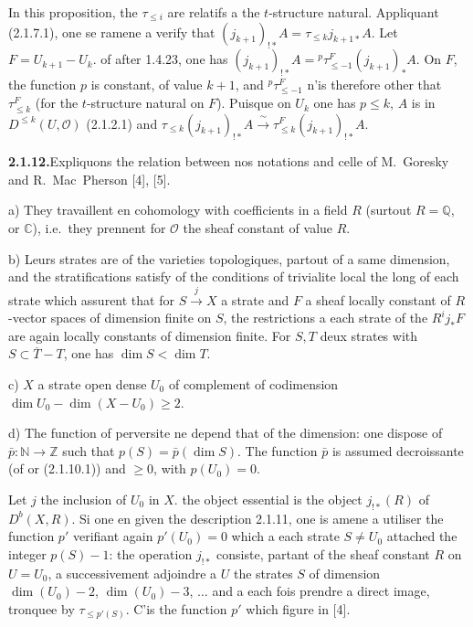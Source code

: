 \documentclass[12pt,a4paper]{article}
\theoremstyle{plain}
\theoremstyle{definition}
\begin{document}
In this proposition, the $\tau_{\leqslant i}$ are relatifs a the $t$-structure natural. Appliquant (2.1.7.1), one se ramene a verify that $(j_{k+1})_{!*} A = \tau_{\leqslant k} j_{k+1*} A$. Let $F = U_{k+1} - U_k$. of after 1.4.23, one has $(j_{k+1})_{!*} A = {}^p \tau_{\leqslant -1}^F (j_{k+1})_* A$. On $F$, the function $p$ is constant, of value $k+1$, and ${}^p \tau_{\leqslant -1}^F$ n'is therefore other that $\tau_{\leqslant k}^F$ (for the $t$-structure natural on $F$). Puisque on $U_k$ one has $p \leqslant k$, $A$ is in $D^{\leqslant k}(U, \mathcal{O})$ (2.1.2.1) and $\tau_{\leqslant k} (j_{k+1})_{!*} A \xrightarrow{\;\sim\;} \tau_{\leqslant k}^F (j_{k+1})_{!*} A$.

\smallskip
\noindent\textbf{2.1.12.}\quad Expliquons the relation between nos notations and celle of M.~Goresky and R.~Mac~Pherson [4], [5].

a) They travaillent en cohomology with coefficients in a field $R$ (surtout $R = \mathbb{Q}$, or $\mathbb{C}$), i.e.\ they prennent for $\mathcal{O}$ the sheaf constant of value $R$.

b) Leurs strates are of the varieties topologiques, partout of a same dimension, and the stratifications satisfy of the conditions of trivialite local the long of each strate which assurent that for $S \xrightarrow{j} X$ a strate and $F$ a sheaf locally constant of $R$-vector spaces of dimension finite on $S$, the restrictions a each strate of the $R^i j_* F$ are again locally constants of dimension finite. For $S, T$ deux strates with $S \subset \overline{T} - T$, one has $\dim S < \dim T$.

c) $X$ a strate open dense $U_0$ of complement of codimension $\dim U_0 - \dim(X - U_0) \geqslant 2$.

d) The function of perversite ne depend that of the dimension: one dispose of $\bar{p} : \mathbb{N} \to \mathbb{Z}$ such that $p(S) = \bar{p}(\dim S)$. The function $\bar{p}$ is assumed decroissante (of or (2.1.10.1)) and $\geqslant 0$, with $p(U_0) = 0$.

Let $j$ the inclusion of $U_0$ in $X$. the object essential is the object $j_{!*}(R)$ of $D^b(X, R)$. Si one en given the description 2.1.11, one is amene a utiliser the function $p'$ verifiant again $p'(U_0) = 0$ which a each strate $S \neq U_0$ attached the integer $p(S) - 1$: the operation $j_{!*}$ consiste, partant of the sheaf constant $R$ on $U = U_0$, a successivement adjoindre a $U$ the strates $S$ of dimension $\dim(U_0) - 2$, $\dim(U_0) - 3$, $\ldots$ and a each fois prendre a direct image, tronquee by $\tau_{\leqslant p'(S)}$. C'is the function $p'$ which figure in [4].
\end{document}

